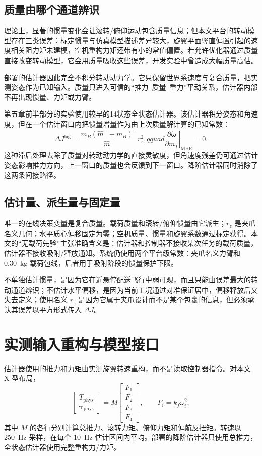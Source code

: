 \documentclass[11pt,UTF8,fontset=none]{ctexrep}
\providecommand{\dJ}{\Delta J}
\providecommand{\mB}{m_B}
\providecommand{\mT}{m_T}
\providecommand{\Tphys}{T_{\mathrm{phys}}}
\providecommand{\tauphys}{\bm{\tau}_{\mathrm{phys}}}
\begin{document}
\subsection{质量由哪个通道辨识}

理论上，显著的惯量变化会让滚转/俯仰运动包含质量信息；但本文平台的转动模型存在三类误差：标定惯量与仿真模型描述差异较大，旋翼平面竖直偏置引起的速度相关阻力矩未建模，空机重构力矩还带有小的常值偏置。若允许优化器通过质量直接改变转动模型，它会用质量吸收这些误差，开发实验中曾造成大幅质量高估。

部署的估计器因此完全不积分转动动力学。它只保留世界系速度与复合质量，把实测姿态作为已知输入。质量只进入可信的“推力--质量--重力”平动关系，估计器内部不再出现惯量、力矩或力臂。

第五章前半部分的实验使用较早的14状态全状态估计器。该估计器积分姿态和角速度，但在一个估计窗口内把惯量增量作为由上次质量解计算的已知常数：
\begin{equation}
\dJ^{\mathrm{lag}}=
\frac{\mB(\hat m^- -\mB)^+}{\hat m^-}r_z^2,qquad
\left.\frac{\partial\dot{\bm\omega}}{\partial\mT}\right|_{\mathrm{MHE}}=0.
\end{equation}
这种滞后处理去除了质量对转动动力学的直接灵敏度，但角速度残差仍可通过估计姿态影响推力方向，上一窗口的质量也会反馈到下一窗口。降阶估计器同时消除了这两条间接路径。

\subsection{估计量、派生量与固定量}

唯一的在线决策变量是复合质量。载荷质量和滚转/俯仰惯量由它派生；$r_z$ 是夹爪名义几何；水平质心偏移固定为零；空机质量、惯量和旋翼系数通过标定获得。本文的“无载荷先验”主张准确含义是：估计器和控制器不接收某次任务的载荷质量，估计器不接收吸附/释放通知。系统仍使用两个平台级常数：夹爪名义力臂和 \SI{0.30}{\kg} 载荷包线，后者用于吸附阶段的惯量保护下限。

不单独估计惯量，是因为它在近悬停配送飞行中弱可观，而且只能由误差最大的转动通道辨识；不估计水平偏移，是因为当前工况通过对准保证居中，偏移释放后又失去定义；使用名义 $r_z$ 是因为它属于夹爪设计而不是某个包裹的信息，但必须承认其误差以平方形式传入 $\dJ$。

\section{实测输入重构与模型接口}

估计器使用的推力和力矩由实测旋翼转速重构，而不是读取控制器指令。对本文 X 型布局，
\begin{equation}
\begin{bmatrix}\Tphys\\\tauphys\end{bmatrix}
=M\begin{bmatrix}F_1\\F_2\\F_3\\F_4\end{bmatrix},
\qquad F_i=k_f\omega_i^2,
\end{equation}
其中 $M$ 的各行分别计算总推力、滚转力矩、俯仰力矩和偏航反扭矩。转速以 \SI{250}{\hertz} 采样，在每个 \SI{10}{\hertz} 估计区间内平均。部署的降阶估计器只使用总推力，全状态估计器使用完整重构力/力矩。
\end{document}
